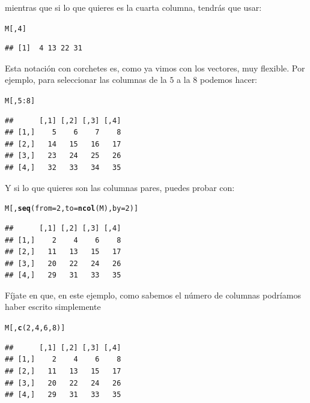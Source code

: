 \documentclass[10pt,a4paper]{article}\usepackage[]{graphicx}\usepackage[]{color}
\makeatletter
\newcommand{\hlnum}[1]{\textcolor[rgb]{0.686,0.059,0.569}{#1}}%
\newcommand{\hlopt}[1]{\textcolor[rgb]{0,0,0}{#1}}%
\newcommand{\hlstd}[1]{\textcolor[rgb]{0.345,0.345,0.345}{#1}}%
\newcommand{\hlkwc}[1]{\textcolor[rgb]{0.333,0.667,0.333}{#1}}%
\newcommand{\hlkwd}[1]{\textcolor[rgb]{0.737,0.353,0.396}{\textbf{#1}}}%
\newenvironment{kframe}{%
 \def\at@end@of@kframe{}%
 \ifinner\ifhmode%
  \def\at@end@of@kframe{\end{minipage}}%
  \begin{minipage}{\columnwidth}%
 \fi\fi%
 \def\FrameCommand##1{\hskip\@totalleftmargin \hskip-\fboxsep
 \colorbox{shadecolor}{##1}\hskip-\fboxsep
     \hskip-\linewidth \hskip-\@totalleftmargin \hskip\columnwidth}%
 \MakeFramed {\advance\hsize-\width
   \@totalleftmargin\z@ \linewidth\hsize
   \@setminipage}}%
 {\par\unskip\endMakeFramed%
 \at@end@of@kframe}
\newenvironment{knitrout}{}{} %
\makeatother
\begin{document}
     mientras que si lo que quieres es la cuarta columna, tendrás que usar:
\begin{knitrout}
\color{fgcolor}\begin{kframe}
\begin{alltt}
\hlstd{M[ ,} \hlnum{4}\hlstd{]}
\end{alltt}
\begin{verbatim}
## [1]  4 13 22 31
\end{verbatim}
\end{kframe}
\end{knitrout}
     Esta notación con corchetes es, como ya vimos con los vectores, muy flexible. Por ejemplo, para seleccionar las columnas de la $5$ a la $8$ podemos hacer:
\begin{knitrout}
\color{fgcolor}\begin{kframe}
\begin{alltt}
\hlstd{M[ ,} \hlnum{5}\hlopt{:}\hlnum{8}\hlstd{]}
\end{alltt}
\begin{verbatim}
##      [,1] [,2] [,3] [,4]
## [1,]    5    6    7    8
## [2,]   14   15   16   17
## [3,]   23   24   25   26
## [4,]   32   33   34   35
\end{verbatim}
\end{kframe}
\end{knitrout}
     Y si lo que quieres son las columnas pares, puedes probar con:
\begin{knitrout}
\color{fgcolor}\begin{kframe}
\begin{alltt}
\hlstd{M[ ,} \hlkwd{seq}\hlstd{(}\hlkwc{from}\hlstd{=}\hlnum{2}\hlstd{,} \hlkwc{to}\hlstd{=}\hlkwd{ncol}\hlstd{(M),} \hlkwc{by}\hlstd{=}\hlnum{2}\hlstd{)]}
\end{alltt}
\begin{verbatim}
##      [,1] [,2] [,3] [,4]
## [1,]    2    4    6    8
## [2,]   11   13   15   17
## [3,]   20   22   24   26
## [4,]   29   31   33   35
\end{verbatim}
\end{kframe}
\end{knitrout}
     Fíjate en que, en este ejemplo, como sabemos el número de columnas podríamos haber escrito simplemente
\begin{knitrout}
\color{fgcolor}\begin{kframe}
\begin{alltt}
     \hlstd{M[ ,} \hlkwd{c}\hlstd{(}\hlnum{2}\hlstd{,}\hlnum{4}\hlstd{,}\hlnum{6}\hlstd{,}\hlnum{8}\hlstd{)]}
\end{alltt}
\begin{verbatim}
##      [,1] [,2] [,3] [,4]
## [1,]    2    4    6    8
## [2,]   11   13   15   17
## [3,]   20   22   24   26
## [4,]   29   31   33   35
\end{verbatim}
\end{kframe}
\end{knitrout}
\end{document}

